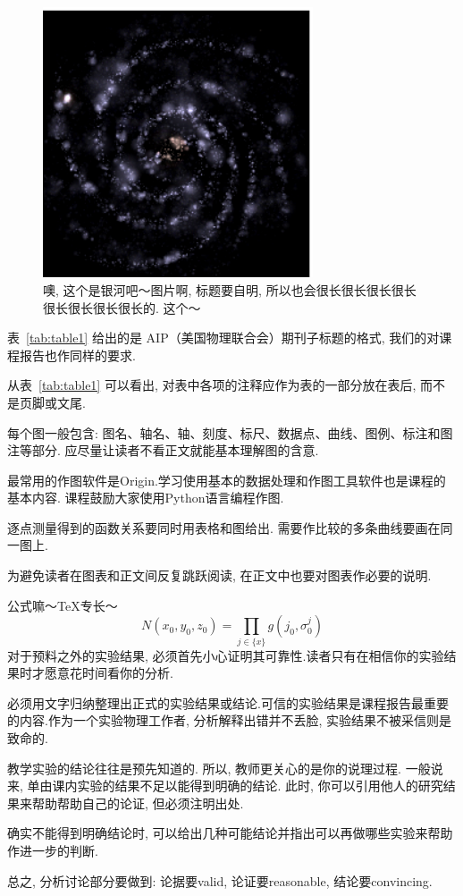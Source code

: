 \documentclass[12pt,a4paper]{article}
\begin{document}
\begin{spacing}{2}
\begin{figure}[htbp]
\centering
\includegraphics[width=80mm]{Gax}
\caption{噢, 这个是银河吧～图片啊, 标题要自明, 所以也会很长很长很长很长很长很长很长很长的. 这个～}
\label{fig:gax}
\end{figure}
表~\ref{tab:table1} 给出的是 AIP（美国物理联合会）期刊子标题的格式, 我们的对课程报告也作同样的要求.\par
从表~\ref{tab:table1} 可以看出, 对表中各项的注释应作为表的一部分放在表后, 而不是页脚或文尾.\par
每个图一般包含: 图名、轴名、轴、刻度、标尺、数据点、曲线、图例、标注和图注等部分. 应尽量让读者不看正文就能基本理解图的含意.\par
最常用的作图软件是Origin.学习使用基本的数据处理和作图工具软件也是课程的基本内容. 课程鼓励大家使用Python语言编程作图.\par
逐点测量得到的函数关系要同时用表格和图给出. 需要作比较的多条曲线要画在同一图上.\par
为避免读者在图表和正文间反复跳跃阅读, 在正文中也要对图表作必要的说明.\par
公式嘛～TeX专长～
\begin{equation}
N(x_0,y_0,z_0)=\prod_{j\in\{x\}}g(j_0,\sigma^j_0) \label{eq:1}
\end{equation}
对于预料之外的实验结果, 必须首先小心证明其可靠性.读者只有在相信你的实验结果时才愿意花时间看你的分析.\par
必须用文字归纳整理出正式的实验结果或结论.可信的实验结果是课程报告最重要的内容.作为一个实验物理工作者, 分析解释出错并不丢脸, 实验结果不被采信则是致命的.\par
教学实验的结论往往是预先知道的. 所以, 教师更关心的是你的说理过程. 一般说来, 单由课内实验的结果不足以能得到明确的结论. 此时, 你可以引用他人的研究结果来帮助帮助自己的论证, 但必须注明出处. \par
确实不能得到明确结论时, 可以给出几种可能结论并指出可以再做哪些实验来帮助作进一步的判断.\par
总之, 分析讨论部分要做到: 论据要valid, 论证要reasonable, 结论要convincing.\par

\end{spacing}
\end{document}
